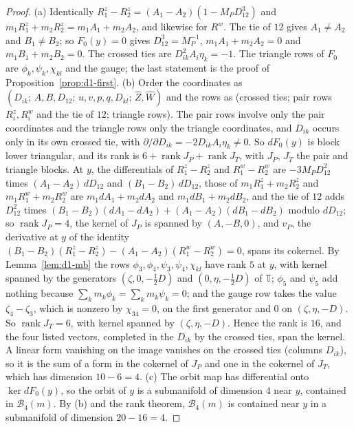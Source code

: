 \begin{proof}
(a) Identically $R^z_1-R^z_2=(A_1-A_2)(1-M_PD_{12}^3)$ and $m_1R^z_1+m_2R^z_2=m_1A_1+m_2A_2$, and
likewise for $R^w$.  The tie of $12$ gives $A_1\ne A_2$ and $B_1\ne B_2$; so $F_0(y)=0$ gives
$D_{12}^3=M_P^{-1}$, $m_1A_1+m_2A_2=0$ and $m_1B_1+m_2B_2=0$.  The crossed ties are
$D_{ik}^2A_i\eta_k=-1$.  The triangle rows of $F_0$ are $\phi_k,\psi_k,\chi_{kl}$ and the gauge;
the last statement is the proof of Proposition~\ref{prop:d1-first}.
(b) Order the coordinates as $(D_{ik};\,A,B,D_{12};\,u,v,p,q,D_{kl};\,\hat Z,\hat W)$ and the rows
as (crossed ties; pair rows $R^z_i,R^w_i$ and the tie of $12$; triangle rows).  The pair rows
involve only the pair coordinates and the triangle rows only the triangle coordinates, and
$D_{ik}$ occurs only in its own crossed tie, with $\partial/\partial D_{ik}=-2D_{ik}A_i\eta_k\ne0$.
So $dF_0(y)$ is block lower triangular, and its rank is $6+\operatorname{rank}J_P+
\operatorname{rank}J_T$, with $J_P$, $J_T$ the pair and triangle blocks.  At $y$, the
differentials of $R^z_1-R^z_2$ and $R^w_1-R^w_2$ are $-3M_PD_{12}^2$ times
$(A_1-A_2)\,dD_{12}$ and $(B_1-B_2)\,dD_{12}$, those of $m_1R^z_1+m_2R^z_2$ and $m_1R^w_1+m_2R^w_2$
are $m_1dA_1+m_2dA_2$ and $m_1dB_1+m_2dB_2$, and the tie of $12$ adds $D_{12}^2$ times
$(B_1-B_2)(dA_1-dA_2)+(A_1-A_2)(dB_1-dB_2)$ modulo $dD_{12}$; so $\operatorname{rank}J_P=4$, the
kernel of $J_P$ is spanned by $(A,-B,0)$, and $v_P$, the derivative at $y$ of the identity
$(B_1-B_2)(R^z_1-R^z_2)-(A_1-A_2)(R^w_1-R^w_2)=0$, spans its cokernel.  By
Lemma~\ref{lem:d1-mb} the rows $\phi_3,\phi_4,\psi_3,\psi_4,\chi_{kl}$ have rank $5$ at $y$, with
kernel spanned by the generators $(\zeta,0,-\frac12D)$ and $(0,\eta,-\frac12D)$ of $\mathbb T$;
$\phi_5$ and $\psi_5$ add nothing because $\sum_km_k\phi_k=\sum_km_k\psi_k=0$; and the gauge row
takes the value $\zeta_4-\zeta_3$, which is nonzero by $\chi_{34}=0$, on the first generator and
$0$ on $(\zeta,\eta,-D)$.  So
$\operatorname{rank}J_T=6$, with kernel spanned by $(\zeta,\eta,-D)$.  Hence the rank is $16$, and
the four listed vectors, completed in the $D_{ik}$ by the crossed ties, span the kernel.  A
linear form vanishing on the image vanishes on the crossed ties (columns $D_{ik}$), so it is the
sum of a form in the cokernel of $J_P$ and one in the cokernel of $J_T$, which has dimension
$10-6=4$.
(c) The orbit map has differential onto $\ker dF_0(y)$, so the orbit of $y$ is a submanifold of
dimension $4$ near $y$, contained in $\mathcal B_4(m)$.  By (b) and the rank theorem,
$\mathcal B_4(m)$ is contained near $y$ in a submanifold of dimension $20-16=4$.
\end{proof}

